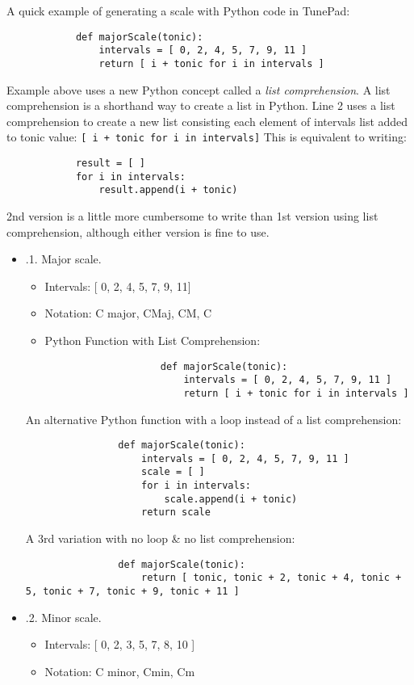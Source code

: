 \documentclass{article}
\begin{document}
\begin{itemize}
\begin{itemize}
		A quick example of generating a scale with Python code in TunePad:
		\begin{verbatim}
			def majorScale(tonic):
			    intervals = [ 0, 2, 4, 5, 7, 9, 11 ]
			    return [ i + tonic for i in intervals ]
		\end{verbatim}
		Example above uses a new Python concept called a {\it list comprehension}. A list comprehension is a shorthand way to create a list in Python. Line 2 uses a list comprehension to create a new list consisting each element of intervals list added to tonic value: {\tt[ i + tonic for i in intervals]} This is equivalent to writing:
		\begin{verbatim}
			result = [ ]
			for i in intervals:
			    result.append(i + tonic)
		\end{verbatim}
		2nd version is a little more cumbersome to write than 1st version using list comprehension, although either version is fine to use.
		\begin{itemize}
			\item {.1. Major scale.}
			\begin{itemize}
				\item Intervals: [ 0, 2, 4, 5, 7, 9, 11]
				\item Notation: C major, CMaj, CM, C
				\item Python Function with List Comprehension:
				\begin{verbatim}
					def majorScale(tonic):
					    intervals = [ 0, 2, 4, 5, 7, 9, 11 ]
					    return [ i + tonic for i in intervals ]
				\end{verbatim}
			\end{itemize}
			An alternative Python function with a loop instead of a list comprehension:
			\begin{verbatim}
				def majorScale(tonic):
				    intervals = [ 0, 2, 4, 5, 7, 9, 11 ]
				    scale = [ ]
				    for i in intervals:
				        scale.append(i + tonic)
				    return scale
			\end{verbatim}
			A 3rd variation with no loop \& no list comprehension:
			\begin{verbatim}
				def majorScale(tonic):
				    return [ tonic, tonic + 2, tonic + 4, tonic + 5, tonic + 7, tonic + 9, tonic + 11 ]
			\end{verbatim}
			\item {.2. Minor scale.}
			\begin{itemize}
				\item Intervals: [ 0, 2, 3, 5, 7, 8, 10 ]
				\item Notation: C minor, Cmin, Cm

\end{itemize}
\end{itemize}
\end{itemize}
\end{itemize}
\end{document}
